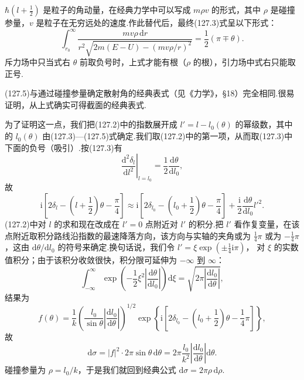 $\hbar\left(l+\frac{1}{2}\right)$ 是粒子的角动量，在经典力学中可以写成 $m\rho v$ 的形式，其中 $\rho$ 是碰撞参量，$v$ 是粒子在无穷远处的速度.作此替代后，最终(127.3)式呈以下形式：
\begin{equation}
  \int_{r_0}^{\infty}\frac{mv\rho\,\mathrm{d}r}
  {r^2\sqrt{2m(E-U)-(mv\rho/r)^2}}
  =\frac{1}{2}(\pi\mp\theta).
\end{equation}
斥力场中只当式右 $\theta$ 前取负号时，上式才能有根（$\rho$ 的根），引力场中式右只能取正号.

(127.5)与通过碰撞参量确定散射角的经典表式（见《力学》，§18）完全相同.很易证明，从上式确实可得截面的经典表式.

为了证明这一点，我们把(127.2)中的指数展开成 $l'=l-l_0(\theta)$ 的幂级数，其中的 $l_0(\theta)$ 由(127.3)—(127.5)式确定.我们取(127.2)中的第一项，从而取(127.3)中下面的负号（吸引）.按(127.3)有
\begin{equation*}
  \left.\frac{\mathrm{d}^2\delta_l}{\mathrm{d}l^2}\right|_{l=l_0}
  =\frac{1}{2}\frac{\mathrm{d}\theta}{\mathrm{d}l_0},
\end{equation*}
故
\begin{equation*}
  \mathrm{i}\left[2\delta_l-\left(l+\frac{1}{2}\right)\theta-\frac{\pi}{4}\right]
  \approx\mathrm{i}\left[2\delta_{l_0}
  -\left(l_0+\frac{1}{2}\right)\theta-\frac{\pi}{4}\right]
  +\frac{\mathrm{i}}{2}\frac{\mathrm{d}\theta}{\mathrm{d}l_0}l'^2.
\end{equation*}
(127.2)中对 $l$ 的求和现在改成在 $l'=0$ 点附近对 $l'$ 的积分.把 $l'$ 看作复变量，在该点附近取积分路线沿指数的最速降落方向，该方向与实轴的夹角或为 $\frac{1}{4}\pi$ 或为 $-\frac{1}{4}\pi$，这由 $\mathrm{d}\theta/\mathrm{d}l_0$ 的符号来确定.换句话说，我们令
$l'=\xi\exp\left(\pm\frac{1}{4}\mathrm{i}\pi\right)$，
对 $\xi$ 的实数值积分；由于该积分收敛很快，积分限可延伸为 $-\infty$ 到 $\infty$：
\begin{equation*}
  \int_{-\infty}^{\infty}
  \exp\left(-\frac{1}{2}\xi^2\left|\frac{\mathrm{d}\theta}{\mathrm{d}l_0}\right|\right)
  \mathrm{d}\xi
  =\sqrt{2\pi\left|\frac{\mathrm{d}l_0}{\mathrm{d}\theta}\right|},
\end{equation*}
结果为
\begin{equation}
  f(\theta)=\frac{1}{k}\left(\frac{l_0}{\sin\theta}
  \left|\frac{\mathrm{d}l_0}{\mathrm{d}\theta}\right|\right)^{1/2}
  \exp\left\{\mathrm{i}\left[2\delta_{l_0}
  -\left(l_0+\frac{1}{2}\right)\theta-\frac{1}{4}\pi\right]\right\},
\end{equation}
故
\begin{equation}
  \mathrm{d}\sigma=|f|^2\cdot2\pi\sin\theta\,\mathrm{d}\theta
  =2\pi\frac{l_0}{k^2}\left|\frac{\mathrm{d}l_0}{\mathrm{d}\theta}\right|
  \mathrm{d}\theta.
\end{equation}
碰撞参量为 $\rho=l_0/k$，于是我们就回到经典公式 $\mathrm{d}\sigma=2\pi\rho\,\mathrm{d}\rho$.

